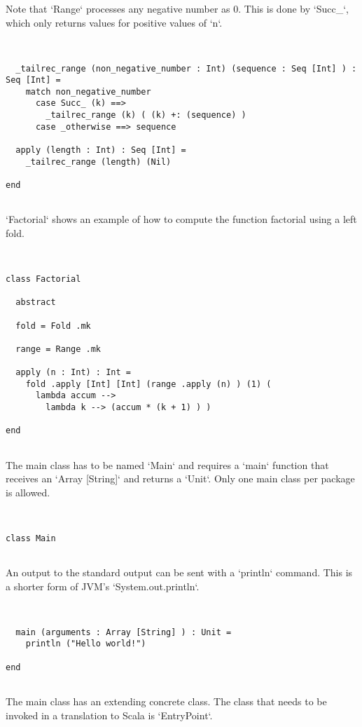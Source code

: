 \documentclass[12pt,a4paper]{article}
\begin{document}
  Note that `Range` processes any negative number as 0. This is done by `Succ_`, which only
   returns values for positive values of `n`.


\begin{lstlisting}


  _tailrec_range (non_negative_number : Int) (sequence : Seq [Int] ) : Seq [Int] =
    match non_negative_number
      case Succ_ (k) ==>
        _tailrec_range (k) ( (k) +: (sequence) )
      case _otherwise ==> sequence

  apply (length : Int) : Seq [Int] =
    _tailrec_range (length) (Nil)

end


\end{lstlisting}

`Factorial` shows an example of how to compute the function factorial using a left fold.


\begin{lstlisting}


class Factorial

  abstract

  fold = Fold .mk

  range = Range .mk

  apply (n : Int) : Int =
    fold .apply [Int] [Int] (range .apply (n) ) (1) (
      lambda accum -->
        lambda k --> (accum * (k + 1) ) )

end


\end{lstlisting}

The main class has to be named `Main` and requires a `main` function that receives an
 `Array [String]` and returns a `Unit`. Only one main class per package is allowed.


\begin{lstlisting}


class Main


\end{lstlisting}

  An output to the standard output can be sent with a `println` command.
   This is a shorter form of JVM's `System.out.println`.


\begin{lstlisting}


  main (arguments : Array [String] ) : Unit =
    println ("Hello world!")

end


\end{lstlisting}

The main class has an extending concrete class. The class that needs to be invoked in a
 translation to Scala is `EntryPoint`.


\begin{lstlisting}


\end{lstlisting}
\end{document}
